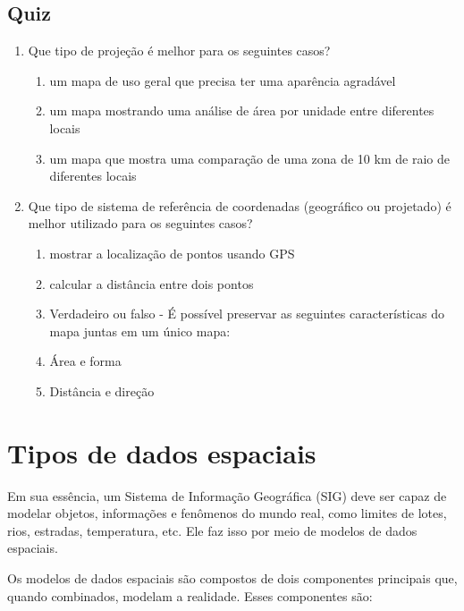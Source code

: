 \documentclass[
]{krantz}
\providecommand{\tightlist}{%
  \setlength{\itemsep}{0pt}\setlength{\parskip}{0pt}}
\begin{document}
\hypertarget{quiz}{%
\subsection{Quiz}\label{quiz}}

\begin{enumerate}
\def\labelenumi{\arabic{enumi}.}
\tightlist
\item
  Que tipo de projeção é melhor para os seguintes casos?

  \begin{enumerate}
  \def\labelenumii{\arabic{enumii}.}
  \tightlist
  \item
    um mapa de uso geral que precisa ter uma aparência agradável
  \item
    um mapa mostrando uma análise de área por unidade entre diferentes locais
  \item
    um mapa que mostra uma comparação de uma zona de 10 km de raio de diferentes locais
  \end{enumerate}
\item
  Que tipo de sistema de referência de coordenadas (geográfico ou projetado) é melhor utilizado para os seguintes casos?

  \begin{enumerate}
  \def\labelenumii{\arabic{enumii}.}
  \tightlist
  \item
    mostrar a localização de pontos usando GPS
  \item
    calcular a distância entre dois pontos
  \item
    Verdadeiro ou falso - É possível preservar as seguintes características do mapa juntas em um único mapa:
  \item
    Área e forma
  \item
    Distância e direção
  \end{enumerate}
\end{enumerate}

\hypertarget{tipos-de-dados-espaciais}{%
\section{Tipos de dados espaciais}\label{tipos-de-dados-espaciais}}

Em sua essência, um Sistema de Informação Geográfica (SIG) deve ser capaz de modelar objetos, informações e fenômenos do mundo real, como limites de lotes, rios, estradas, temperatura, etc. Ele faz isso por meio de modelos de dados espaciais.

Os modelos de dados espaciais são compostos de dois componentes principais que, quando combinados, modelam a realidade. Esses componentes são:
\end{document}
